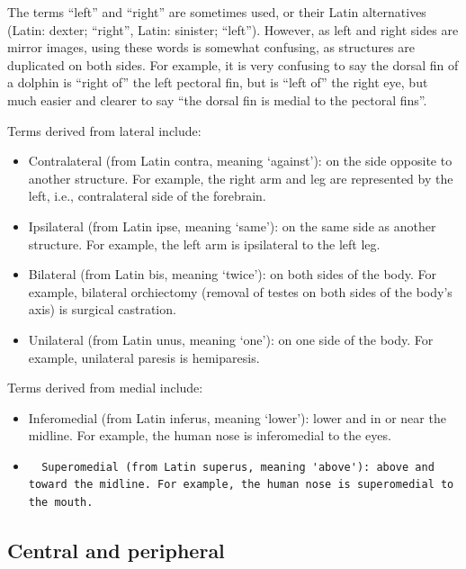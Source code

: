 The terms ``left'' and ``right'' are sometimes used, or their Latin alternatives (Latin: dexter; ``right'', Latin: sinister; ``left''). However, as left and right sides are mirror images, using these words is somewhat confusing, as structures are duplicated on both sides. For example, it is very confusing to say the dorsal fin of a dolphin is ``right of'' the left pectoral fin, but is ``left of'' the right eye, but much easier and clearer to say ``the dorsal fin is medial to the pectoral fins''.

Terms derived from lateral include:

\begin{itemize}
\tightlist
\item
  Contralateral (from Latin contra, meaning `against'): on the side opposite to another structure. For example, the right arm and leg are represented by the left, i.e., contralateral side of the forebrain.
\item
  Ipsilateral (from Latin ipse, meaning `same'): on the same side as another structure. For example, the left arm is ipsilateral to the left leg.
\item
  Bilateral (from Latin bis, meaning `twice'): on both sides of the body. For example, bilateral orchiectomy (removal of testes on both sides of the body's axis) is surgical castration.
\item
  Unilateral (from Latin unus, meaning `one'): on one side of the body. For example, unilateral paresis is hemiparesis.
\end{itemize}

Terms derived from medial include:

\begin{itemize}
\item
  Inferomedial (from Latin inferus, meaning `lower'): lower and in or near the midline. For example, the human nose is inferomedial to the eyes.
\item
\begin{verbatim}
  Superomedial (from Latin superus, meaning 'above'): above and toward the midline. For example, the human nose is superomedial to the mouth.
\end{verbatim}
\end{itemize}

\hypertarget{central-and-peripheral}{%
\subsection{Central and peripheral}\label{central-and-peripheral}}

